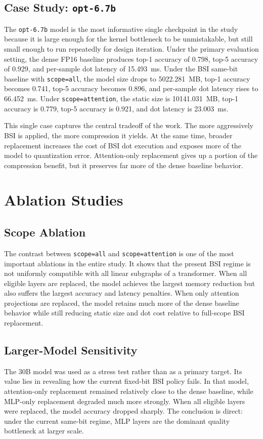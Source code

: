 \subsection{Case Study: \texttt{opt-6.7b}}
The \texttt{opt-6.7b} model is the most informative single checkpoint in the study because it is large enough for the kernel bottleneck to be unmistakable, but still small enough to run repeatedly for design iteration. Under the primary evaluation setting, the dense FP16 baseline produces top-1 accuracy of 0.798, top-5 accuracy of 0.929, and per-sample dot latency of 15.493~ms. Under the BSI same-bit baseline with \texttt{scope=all}, the model size drops to 5022.281~MB, top-1 accuracy becomes 0.741, top-5 accuracy becomes 0.896, and per-sample dot latency rises to 66.452~ms. Under \texttt{scope=attention}, the static size is 10141.031~MB, top-1 accuracy is 0.779, top-5 accuracy is 0.921, and dot latency is 23.003~ms.

This single case captures the central tradeoff of the work. The more aggressively BSI is applied, the more compression it yields. At the same time, broader replacement increases the cost of BSI dot execution and exposes more of the model to quantization error. Attention-only replacement gives up a portion of the compression benefit, but it preserves far more of the dense baseline behavior.

\section{Ablation Studies}\label{sec:ablation}
\subsection{Scope Ablation}
The contrast between \texttt{scope=all} and \texttt{scope=attention} is one of the most important ablations in the entire study. It shows that the present BSI regime is not uniformly compatible with all linear subgraphs of a transformer. When all eligible layers are replaced, the model achieves the largest memory reduction but also suffers the largest accuracy and latency penalties. When only attention projections are replaced, the model retains much more of the dense baseline behavior while still reducing static size and dot cost relative to full-scope BSI replacement.

\subsection{Larger-Model Sensitivity}
The 30B model was used as a stress test rather than as a primary target. Its value lies in revealing how the current fixed-bit BSI policy fails. In that model, attention-only replacement remained relatively close to the dense baseline, while MLP-only replacement degraded much more strongly. When all eligible layers were replaced, the model accuracy dropped sharply. The conclusion is direct: under the current same-bit regime, MLP layers are the dominant quality bottleneck at larger scale.

